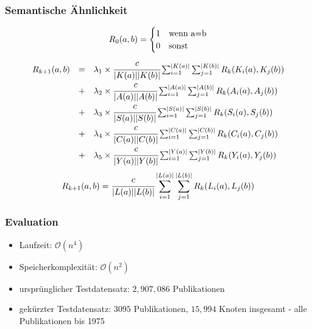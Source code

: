 \documentclass[12pt, xcolor=table]{beamer}
\begin{document}
\begin{frame}
    \frametitle{Semantische Ähnlichkeit}
\scriptsize{
\[
 R_0(a,b) =
    \begin{cases}
     1 & \text{wenn } $a$ = $b$ \\
     0 & \text{sonst}\\
    \end{cases}
\]
\newline
{}
\[
\begin{array}{lcl}
 R_{k+1}(a,b) & = & 
        \lambda_1\times\cfrac{c}{|K(a)||K(b)|}
        \sum_{i=1}^{|K(a)|} \sum_{j=1}^{|K(b)|} R_k(K_i(a),K_j(b))
        \\ & + &
        \lambda_2\times\cfrac{c}{|A(a)||A(b)|}
        \sum_{i=1}^{|A(a)|} \sum_{j=1}^{|A(b)|} R_k(A_i(a),A_j(b))
        \\ & + &
        \lambda_3\times\cfrac{c}{|S(a)||S(b)|}
        \sum_{i=1}^{|S(a)|} \sum_{j=1}^{|S(b)|} R_k(S_i(a),S_j(b))
        \\ & + &
        \lambda_4\times\cfrac{c}{|C(a)||C(b)|}
        \sum_{i=1}^{|C(a)|} \sum_{j=1}^{|C(b)|} R_k(C_i(a),C_j(b))
        \\ & + &
        \lambda_5\times\cfrac{c}{|Y(a)||Y(b)|}
        \sum_{i=1}^{|Y(a)|} \sum_{j=1}^{|Y(b)|} R_k(Y_i(a),Y_j(b))
\end{array}
\]
\newline
{}
\[
R_{k+1}(a,b)  = 
        \cfrac{c}{|L(a)||L(b)|}
        \sum_{i=1}^{|L(a)|} \sum_{j=1}^{|L(b)|} R_k(L_i(a),L_j(b))
\]
}
\end{frame}

\begin{frame}
    \frametitle{Evaluation}
    \begin{itemize}
        \item Laufzeit: $\mathcal{O}(n^4)$
        \item Speicherkomplexität: $\mathcal{O}(n^2)$
        \item ursprünglicher Testdatensatz: $2,907,086$ Publikationen
        \item gekürzter Testdatensatz: $3095$ Publikationen, $15,994$ Knoten insgesamt - alle Publikationen bis 1975
    \end{itemize}
\end{frame}
\end{document}

